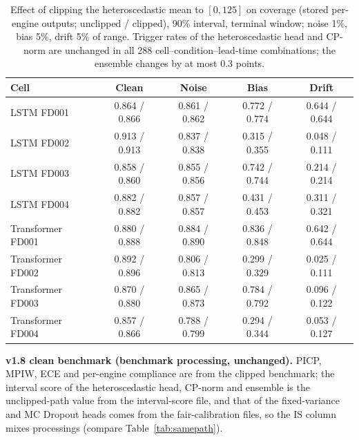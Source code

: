 \documentclass[10pt,a4paper]{article}
\newcommand{\JClipRateMaxEns}{0.3}
\newcommand{\JClipRateN}{288}
\begin{document}
\begin{table}[H]\centering\scriptsize
\caption{Effect of clipping the heteroscedastic mean to $[0,125]$ on coverage (stored per-engine outputs; unclipped / clipped), 90\% interval, terminal window; noise 1\%, bias 5\%, drift 5\% of range. Trigger rates of the heteroscedastic head and CP-norm are unchanged in all \JClipRateN{} cell--condition--lead-time combinations; the ensemble changes by at most \JClipRateMaxEns{} points.}
\begin{tabular}{lcccc}\toprule Cell & Clean & Noise & Bias & Drift \\ \midrule
LSTM FD001 & 0.864 / 0.866 & 0.861 / 0.862 & 0.772 / 0.774 & 0.644 / 0.644 \\
LSTM FD002 & 0.913 / 0.913 & 0.837 / 0.838 & 0.315 / 0.355 & 0.048 / 0.111 \\
LSTM FD003 & 0.858 / 0.860 & 0.855 / 0.856 & 0.742 / 0.744 & 0.214 / 0.214 \\
LSTM FD004 & 0.882 / 0.882 & 0.857 / 0.857 & 0.431 / 0.453 & 0.311 / 0.321 \\
Transformer FD001 & 0.880 / 0.888 & 0.884 / 0.890 & 0.836 / 0.848 & 0.642 / 0.644 \\
Transformer FD002 & 0.892 / 0.896 & 0.806 / 0.813 & 0.299 / 0.329 & 0.025 / 0.111 \\
Transformer FD003 & 0.870 / 0.880 & 0.865 / 0.873 & 0.784 / 0.792 & 0.096 / 0.122 \\
Transformer FD004 & 0.857 / 0.866 & 0.788 / 0.799 & 0.294 / 0.344 & 0.053 / 0.127 \\
\bottomrule\end{tabular}
\end{table}
\FloatBarrier
\noindent\textbf{v1.8 clean benchmark (benchmark processing, unchanged).} PICP, MPIW, ECE and per-engine compliance are from the clipped benchmark; the interval score of the heteroscedastic head, CP-norm and ensemble is the unclipped-path value from the interval-score file, and that of the fixed-variance and MC Dropout heads comes from the fair-calibration files, so the IS column mixes processings (compare Table~\ref{tab:samepath}).
\end{document}

